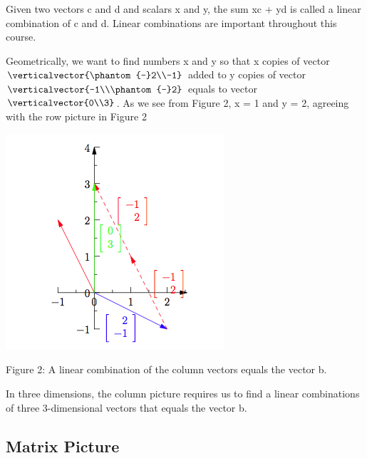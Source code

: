 \documentclass{ximera}
\begin{document}
\noindent
Given two vectors c and d and scalars x and y, the sum xc + yd is called a linear combination of c and d. Linear combinations are important throughout this course.

\noindent
Geometrically, we want to find numbers x and y so that x copies of vector $\verticalvector{\phantom{-}2\\-1}$ added to y copies of vector $\verticalvector{-1\\\phantom{-}2}$ equals to vector $\verticalvector{0\\3}$. As we see from Figure 2, x = 1 and y = 2, agreeing with the row picture in Figure 2

\begin{center}
\includegraphics{Geometry2.png}

Figure 2: A linear combination of the column vectors equals the vector b.

\end{center}

\noindent
In three dimensions, the column picture requires us to find a linear combinations of three 3-dimensional vectors that equals the vector b.

\subsection*{Matrix Picture}
\end{document}
